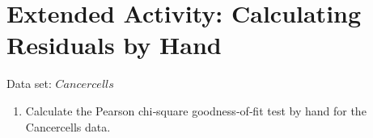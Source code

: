 \documentclass[
]{report}
\providecommand{\tightlist}{%
  \setlength{\itemsep}{0pt}\setlength{\parskip}{0pt}}
\begin{document}
\hypertarget{extended-activity-calculating-residuals-by-hand}{%
\section*{Extended Activity: Calculating Residuals by Hand}\label{extended-activity-calculating-residuals-by-hand}}

Data set: \(Cancercells\)

\begin{enumerate}
\def\labelenumi{\arabic{enumi}.}
\setcounter{enumi}{28}
\tightlist
\item
  Calculate the Pearson chi‐square goodness‐of‐fit test by hand for the Cancercells data.\\
\end{enumerate}
\end{document}
